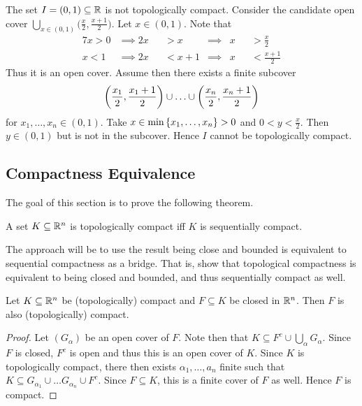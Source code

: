 \documentclass[../main.tex]{subfiles}
\begin{document}
\begin{example}
    The set $I = (0,1) \subseteq \mathbb{R}$ is not topologically compact. Consider the candidate open cover $\bigcup_{x \in (0,1)} \bigl(\frac{x}{2}, \frac{x+1}{2}\bigr)$. Let $x \in (0,1)$. Note that
    \begin{alignat*}{7}
        x > 0 &\implies 2x &&> x     &\implies& x &&> \frac{x}{2} \\
        x < 1 &\implies 2x &&< x + 1 &\implies& x &&< \frac{x+1}{2}
    \end{alignat*}
    Thus it is an open cover. Assume then there exists a finite subcover
    \[
        \qty(\frac{x_1}{2}, \frac{x_1+1}{2}) \cup \ldots \cup \qty(\frac{x_n}{2}, \frac{x_n + 1}{2})
    \]
    for $x_1, \ldots, x_n \in (0,1)$. Take $x \in \min\qty{x_1, \ldots, x_n} > 0$ and $0 < y < \frac{x}{2}$. Then $y \in (0,1)$ but is not in the subcover. Hence $I$ cannot be topologically compact.
\end{example}

\subsection{Compactness Equivalence}

The goal of this section is to prove the following theorem.

\begin{theorem}
    A set $K \subseteq \mathbb{R}^n$ is topologically compact iff $K$ is sequentially compact.
\end{theorem}

The approach will be to use the result being close and bounded is equivalent to sequential compactness as a bridge. That is, show that topological compactness is equivalent to being closed and bounded, and thus sequentially compact as well.

\begin{lemma}
    \label{lemma:closed_subs_are_compact}
    Let $K \subseteq \mathbb{R}^n$ be (topologically) compact and $F \subseteq K$ be closed in $\mathbb{R}^n$. Then $F$ is also (topologically) compact.
\end{lemma}

\begin{proof}
    Let $(G_{\alpha})$ be an open cover of $F$. Note then that $K \subseteq F^c \cup \bigcup_{\alpha} G_{\alpha}$. Since $F$ is closed, $F^c$ is open and thus this is an open cover of $K$. Since $K$ is topologically compact, there then exists $\alpha_1, \ldots, a_n$ finite such that $K \subseteq G_{\alpha_1} \cup \ldots G_{\alpha_n} \cup F^c$. Since $F \subseteq K$, this is a finite cover of $F$ as well. Hence $F$ is compact.
\end{proof}
\end{document}
